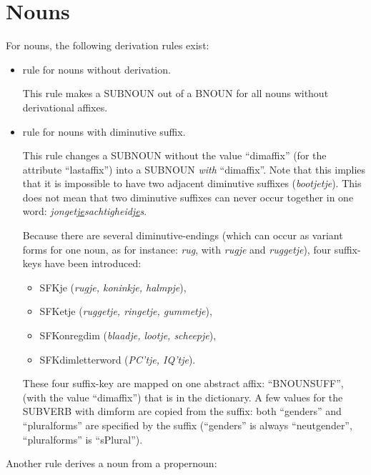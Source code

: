 \newpage

\section{Nouns}

For nouns, the following derivation rules exist:

\begin{itemize}
  \item rule for nouns without derivation.

        This rule makes a SUBNOUN out of a BNOUN for all nouns without 
        derivational affixes.

  \item rule for nouns with diminutive suffix.
    
        This rule changes a SUBNOUN without the value ``dimaffix'' (for the
        attribute ``lastaffix'') into a SUBNOUN {\em with} ``dimaffix''.
        Note that this implies that it is impossible to have two adjacent 
        diminutive suffixes ({\em *bootjetje}). This does not mean that two 
        diminutive suffixes can never occur together in one word:
        {\em jonget\underline{je}sachtigheid\underline{je}s}.

        Because there are several diminutive-endings (which can occur 
        as variant forms for one noun, as for instance: {\em rug}, with
        {\em rugje} and {\em ruggetje}), four suffix-keys have been introduced:
         \begin{itemize}
           \item SFKje   ({\em rugje, koninkje, halmpje}),
           \item SFKetje ({\em ruggetje, ringetje, gummetje}), 
           \item SFKonregdim ({\em blaadje, lootje, scheepje}), 
           \item SFKdimletterword ({\em PC'tje, IQ'tje}).
         \end{itemize}
        These four suffix-key are mapped on one abstract affix: ``BNOUNSUFF'',
        (with the value ``dimaffix'') that is in the dictionary.
        A few values for the SUBVERB with dimform are copied from the suffix:
        both ``genders'' and ``pluralforms'' are specified by the suffix 
        (``genders'' is always ``neutgender'', ``pluralforms'' is ``sPlural'').
\end{itemize}

Another rule derives a noun from a propernoun:

